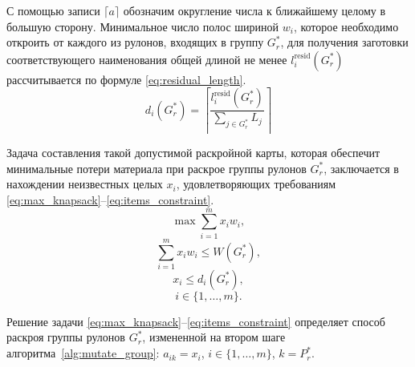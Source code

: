 \documentclass[12pt]{article}
\begin{document}
С помощью записи $\lceil a \rceil$ обозначим округление числа к ближайшему 
целому в большую сторону. Минимальное число полос шириной $w_i$, которое 
необходимо откроить от каждого из рулонов, входящих в группу $G_r^*$, для 
получения заготовки соответствующего наименования общей длиной не менее 
$l_{i}^{\text{resid}}(G_r^*)$ рассчитывается по формуле 
\eqref{eq:residual_length}.
\begin{equation}\label{eq:residual_length}
d_i(G_r^*)=\left\lceil \frac{l_{i}^{\text{resid}}(G_r^*)}
                            {\sum_{j \in G_r^*} L_j} \right\rceil    
\end{equation}
    
Задача составления такой допустимой раскройной карты, которая обеспечит 
минимальные потери материала при раскрое группы рулонов $G_r^*$, заключается 
в нахождении неизвестных целых $x_i$, удовлетворяющих требованиям 
\eqref{eq:max_knapsack}--\eqref{eq:items_constraint}.    
\begin{equation}\label{eq:max_knapsack}
    \max{\sum_{i=1}^{m} x_i w_i},
\end{equation}        
\begin{equation}\label{eq:knapsack_constraint}
    \sum_{i=1}^{m} x_i w_i \leq W(G_r^*),
\end{equation}        
\begin{equation}\label{eq:items_constraint}
    x_i \leq d_i(G_r^*),
\end{equation}        
\[ i \in \{1,\ldots,m\}. \]

Решение задачи 
\eqref{eq:max_knapsack}--\eqref{eq:items_constraint} 
определяет способ раскроя группы рулонов $G_r^*$, 
измененной на втором шаге алгоритма~\ref{alg:mutate_group}: 
$a_{ik}=x_i$, $i \in \{1,\ldots,m\}$, $k=P_r^*$.
\end{document}
